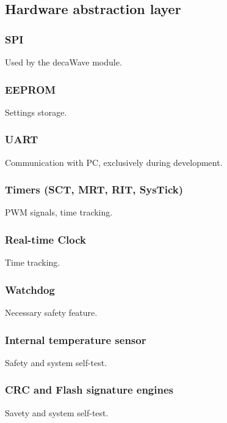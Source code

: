 \subsection{Hardware abstraction layer}



\subsubsection{SPI}
Used by the decaWave module.

\subsubsection{EEPROM}
Settings storage.

\subsubsection{UART}
Communication with PC, exclusively during development.

\subsubsection{Timers (SCT, MRT, RIT, SysTick)}
PWM signals, time tracking.

\subsubsection{Real-time Clock}
Time tracking.

\subsubsection{Watchdog}
Necessary safety feature.

\subsubsection{Internal temperature sensor}
Safety and system self-test.

\subsubsection{CRC and Flash signature engines}
Savety and system self-test.



